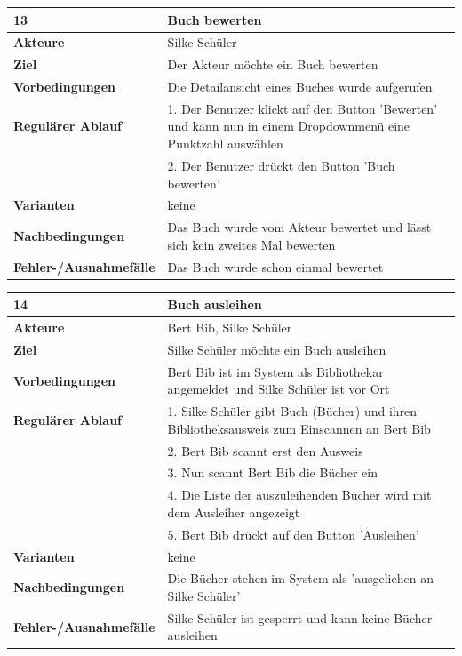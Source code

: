 \documentclass[fontsize=12pt,paper=a4,twoside]{scrartcl}
\begin{document}
\newpage

\begin{table}[htbp]
\label{13}
\begin{tabular}{|l|p{10cm}|}
\hline 
\textbf{13} & \textbf{Buch bewerten} \\ \hline
\textbf{Akteure} & Silke Schüler\\ \hline
\textbf{Ziel} & Der Akteur möchte ein Buch bewerten \\ \hline
\textbf{Vorbedingungen} & Die Detailansicht eines Buches wurde aufgerufen \\ \hline
\textbf{Regulärer Ablauf} & 
1. Der Benutzer klickt auf den Button 'Bewerten' und kann nun in einem Dropdownmenü eine Punktzahl auswählen\\
&2. Der Benutzer drückt den Button 'Buch bewerten'\\
\hline
\textbf{Varianten} & 
keine \\ \hline
\textbf{Nachbedingungen} & Das Buch wurde vom Akteur bewertet und lässt sich kein zweites Mal bewerten\\ \hline
\textbf{Fehler-/Ausnahmefälle} & Das Buch wurde schon einmal bewertet\\
\hline
\end{tabular}
\end{table}

\begin{table}[htbp]
\label{14}
\begin{tabular}{|l|p{10cm}|}
\hline 
\textbf{14} & \textbf{Buch ausleihen} \\ \hline
\textbf{Akteure} & Bert Bib, Silke Schüler\\ \hline
\textbf{Ziel} & Silke Schüler möchte ein Buch ausleihen \\ \hline
\textbf{Vorbedingungen} & Bert Bib ist im System als Bibliothekar angemeldet und Silke Schüler ist vor Ort \\ \hline
\textbf{Regulärer Ablauf} & 
1. Silke Schüler gibt Buch (Bücher) und ihren Bibliotheksausweis zum Einscannen an Bert Bib\\
&2. Bert Bib scannt erst den Ausweis\\
&3. Nun scannt Bert Bib die Bücher ein\\
&4. Die Liste der auszuleihenden Bücher wird mit dem Ausleiher angezeigt\\
&5. Bert Bib drückt auf den Button 'Ausleihen'\\
\hline
\textbf{Varianten} & 
keine \\ \hline
\textbf{Nachbedingungen} & Die Bücher stehen im System als 'ausgeliehen an Silke Schüler'\\ \hline
\textbf{Fehler-/Ausnahmefälle} & Silke Schüler ist gesperrt und kann keine Bücher ausleihen\\
\hline
\end{tabular}
\end{table}
\end{document}
